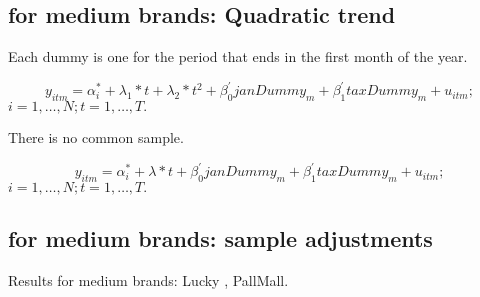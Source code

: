 \subsection{for medium brands: Quadratic trend}
Each dummy is one for the period that ends in the first month of the year. 

\begin{equation*} 
	y_{itm}  = \alpha_{i}^{*} + \lambda_{1}*t +  \lambda_{2}*t^{2} +\beta_{0}^{'}janDummy_{m} + \beta_{1}^{'}taxDummy_{m} + u_{itm}
	;  
\end{equation*}
$i  = 1,\ldots,N;  t=1,\ldots,T. $



There is no common sample. 

\begin{equation*} 
	y_{itm}  = \alpha_{i}^{*} + \lambda*t +  \beta_{0}^{'}janDummy_{m} + \beta_{1}^{'}taxDummy_{m} + u_{itm}
	;  
\end{equation*}
$i  = 1,\ldots,N;  t=1,\ldots,T. $

\subsection{for medium brands: sample adjustments }
Results for medium brands: Lucky , PallMall.


